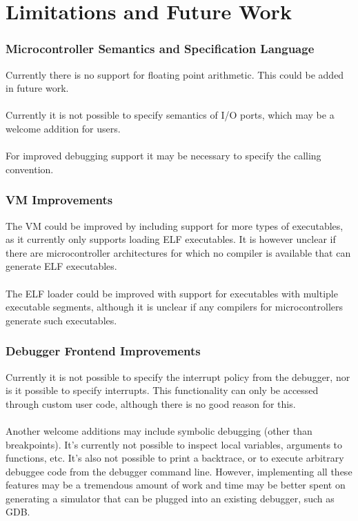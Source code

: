 \chapter{Limitations and Future Work}

\subsection{Microcontroller Semantics and Specification Language}
Currently there is no support for floating point arithmetic. This could be
added in future work.\\
\\
Currently it is not possible to specify semantics of I/O ports, which may be a
welcome addition for users.\\
\\
For improved debugging support it may be necessary to specify the calling
convention.

\subsection{VM Improvements}
The VM could be improved by including support for more types of executables, as
it currently only supports loading ELF executables. It is however unclear if there are
microcontroller architectures for which no compiler is available that can
generate ELF executables.\\
\\
The ELF loader could be improved with support for executables with multiple 
executable segments, although it is unclear if any compilers for microcontrollers
generate such executables.

\subsection{Debugger Frontend Improvements}
Currently it is not possible to specify the interrupt policy from the
debugger, nor is it possible to specify interrupts. This functionality can
only be accessed through custom user code, although there is no good reason
for this.\\
\\
Another welcome additions may include symbolic debugging (other than
breakpoints). It's currently not possible to inspect local variables,
arguments to functions, etc. It's also not possible to print a backtrace, or
to execute arbitrary debuggee code from the debugger command line. 
However, implementing all these
features may be a tremendous amount of work and time may be better spent on
generating a simulator that can be plugged into an existing debugger, such as
GDB.

